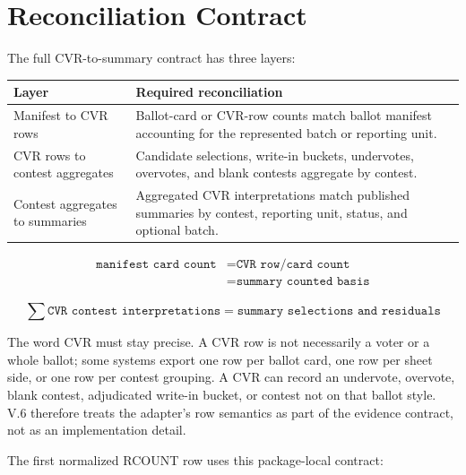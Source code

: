 \section{Reconciliation Contract}

The full CVR-to-summary contract has three layers:

\begin{center}
\small
\begin{tabularx}{\textwidth}{lX}
\toprule
Layer & Required reconciliation \\
\midrule
Manifest to CVR rows & Ballot-card or CVR-row counts match ballot manifest accounting for the represented batch or reporting unit. \\
CVR rows to contest aggregates & Candidate selections, write-in buckets, undervotes, overvotes, and blank contests aggregate by contest. \\
Contest aggregates to summaries & Aggregated CVR interpretations match published summaries by contest, reporting unit, status, and optional batch. \\
\bottomrule
\end{tabularx}
\end{center}

\begin{align*}
\texttt{manifest card count}
  &= \texttt{CVR row/card count} \\
  &= \texttt{summary counted basis}
\end{align*}

\[
\sum \texttt{CVR contest interpretations}
  = \texttt{summary selections and residuals}
\]

The word CVR must stay precise. A CVR row is not necessarily a voter or a whole
ballot; some systems export one row per ballot card, one row per sheet side, or
one row per contest grouping. A CVR can record an undervote, overvote, blank
contest, adjudicated write-in bucket, or contest not on that ballot style. V.6
therefore treats the adapter's row semantics as part of the evidence contract,
not as an implementation detail.

The first normalized RCOUNT row uses this package-local contract:

